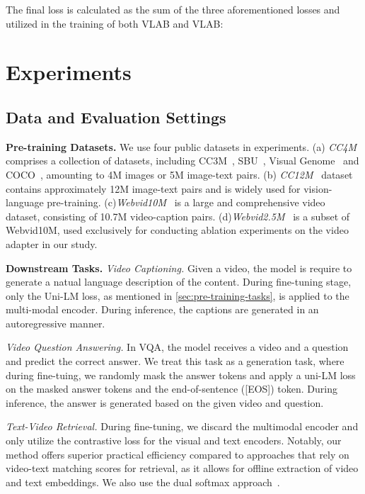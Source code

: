 \documentclass{article}
\begin{document}
The final loss is calculated as the sum of the three aforementioned losses and utilized in the training of both VLAB and VLAB: 


\section{Experiments}

\subsection{Data and Evaluation Settings}

\noindent\textbf{Pre-training Datasets.} 
We use four public datasets in experiments. (a) \textit{CC4M} comprises a collection of datasets, including CC3M~\cite{sharma2018conceptual}, SBU~\cite{ordonez2011im2text}, Visual Genome~\cite{krishna2017visual} and COCO~\cite{chen2015microsoft}, amounting to 4M images or 5M image-text pairs. (b) \textit{CC12M}~\cite{changpinyo2021conceptual} dataset contains approximately 12M image-text pairs and is widely used for vision-language pre-training. (c)\textit{Webvid10M}~\cite{bain2021frozen} is a large and  comprehensive video dataset, consisting of 10.7M video-caption pairs. (d)\textit{Webvid2.5M}~\cite{bain2021frozen} is a subset of Webvid10M, used exclusively for conducting ablation experiments on the video adapter in our study.

\noindent\textbf{Downstream Tasks.}
\textit{Video Captioning.} Given a video, the model is require to generate a natual language description of the content. During fine-tuning stage, only the Uni-LM loss, as mentioned in \cref{sec:pre-training-tasks}, is applied to the multi-modal encoder. During inference, the captions are generated in an autoregressive manner.

\textit{Video Question Answering.} In VQA, the model receives a video and a question and predict the correct answer. We treat this task as a generation task, where during fine-tuing, we randomly mask the answer tokens and apply a uni-LM loss on the masked answer tokens and the end-of-sentence ([EOS]) token. During inference, the answer is generated based on the given video and question.

\textit{Text-Video Retrieval.} 
During fine-tuning, we discard the multimodal encoder and only utilize the contrastive loss for the visual and text encoders. Notably, our method offers superior practical efficiency compared to approaches that rely on video-text matching scores for retrieval, as it allows for offline extraction of video and text embeddings. We also use the dual softmax approach~\cite{cheng2021improving}.
\end{document}
